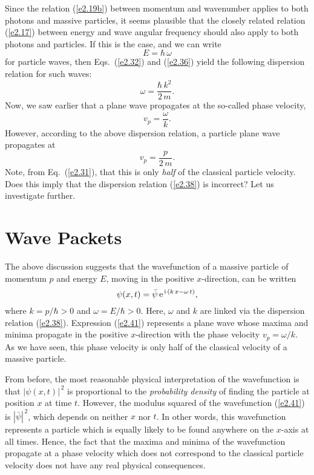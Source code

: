 Since the relation (\ref{e2.19b}) between momentum and wavenumber applies to both photons and massive particles,
it seems plausible that the closely related relation (\ref{e2.17}) 
between energy and wave angular frequency should  also apply to both photons
and particles. If this is the case, and we can write
\begin{equation}
E = \hbar\,\omega
\end{equation}
for particle waves, then Eqs.~(\ref{e2.32}) and (\ref{e2.36}) yield the
following dispersion relation for such waves:
\begin{equation}\label{e2.38}
\omega = \frac{\hbar\,k^2}{2\,m}.
\end{equation}
Now, we saw earlier that a plane wave propagates at the
so-called phase velocity,
\begin{equation}\label{epha}
v_p = \frac{\omega}{k}.
\end{equation}
However, according to the above dispersion relation,  a 
particle plane wave propagates at
\begin{equation}
v_p = \frac{p}{2\,m}.
\end{equation}
Note, from Eq.~(\ref{e2.31}), that this is only {\em half}\/ of the classical particle
velocity. Does this imply that the dispersion relation (\ref{e2.38}) is
incorrect? Let us investigate further.

\section{Wave Packets}\label{s2.9}
The above discussion suggests that the wavefunction of a massive particle
of momentum $p$ and energy $E$, moving in the positive $x$-direction,  can be written
\begin{equation}\label{e2.41}
\psi(x,t) = \bar{\psi}\,{\rm e}^{\,{\rm i}\,(k\,x-\omega\,t)},
\end{equation}
where $k= p/\hbar>0$ and $\omega = E/\hbar>0$. Here, $\omega$ and
$k$ are linked via the dispersion relation (\ref{e2.38}). Expression (\ref{e2.41}) represents a plane wave whose maxima and
minima propagate in the positive $x$-direction
with the phase velocity $v_p=\omega/k$. As we have seen, this phase velocity is only half of the classical velocity of a massive particle.

From before, the most reasonable physical interpretation of the wavefunction is that
$|\psi(x,t)|^{\,2}$ is proportional to the {\em probability density}\/ of finding the particle
at position $x$ at time $t$.  However, the modulus squared of the wavefunction (\ref{e2.41}) is $|\bar{\psi}|^{\,2}$, which depends on neither $x$ nor $t$. In other words, this wavefunction represents a particle
which is equally likely to be found anywhere on the $x$-axis at all times. 
Hence, the fact that the maxima and minima of the  wavefunction  propagate at 
a phase velocity which does not correspond to the classical particle velocity does not have any real physical consequences.

